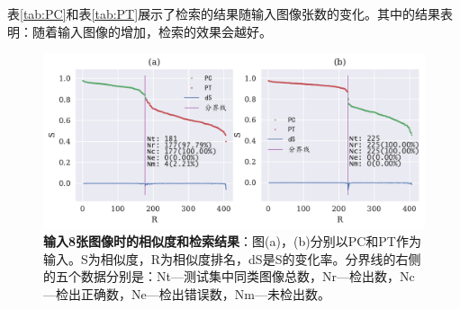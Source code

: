 表\ref{tab:PC}和表\ref{tab:PT}展示了检索的结果随输入图像张数的变化。其中的结果表明：随着输入图像的增加，检索的效果会越好。

\begin{figure}[H]
	\centering
	\includegraphics[width=\linewidth]{../figures/retrieval/8.pdf}
	\caption{\textbf{输入8张图像时的相似度和检索结果}：图(a)，(b)分别以PC和PT作为输入。S为相似度，R为相似度排名，dS是S的变化率。分界线的右侧的五个数据分别是：Nt—测试集中同类图像总数，Nr—检出数，Nc—检出正确数，Ne—检出错误数，Nm—未检出数。}
	\label{fig:r1}
\end{figure}

